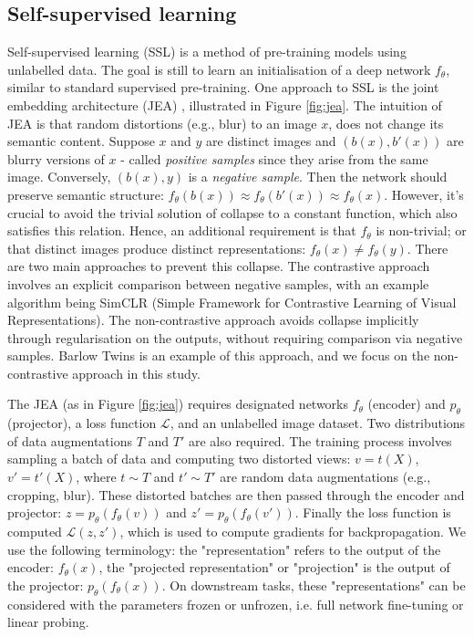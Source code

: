 \documentclass[a4paper,fleqn]{cas-dc}
\begin{document}
\subsection{Self-supervised learning}
Self-supervised learning (SSL) is a method of pre-training models using unlabelled data. The goal is still to learn an initialisation of a deep network $f_{\theta}$, similar to standard supervised pre-training. One approach to SSL is the joint embedding architecture (JEA) \cite{lecun2021self}, illustrated in Figure \ref{fig:jea}. The intuition of JEA  is that random distortions (e.g., blur) to an image $x$, does not change its semantic content. Suppose $x$ and $y$ are distinct images and $(b(x),b'(x))$ are blurry versions of $x$ - called \textit{positive samples} since they arise from the same image. Conversely, $(b(x),y)$ is a \textit{negative sample}. Then  the network should preserve semantic structure: $f_\theta(b(x)) \approx f_\theta(b'(x)) \approx f_\theta(x) $. However, it's crucial to avoid the trivial solution of collapse to a constant function, which also satisfies this relation. Hence, an additional requirement is that $f_\theta$ is non-trivial; or that distinct images produce distinct representations: $f_\theta(x) \neq f_\theta(y)$. There are two main approaches to prevent this collapse. The contrastive approach involves an explicit comparison between negative samples, with an example algorithm being SimCLR \cite{chen2020simple} (Simple Framework for Contrastive Learning of Visual Representations). The non-contrastive 
approach avoids collapse implicitly through regularisation on the outputs, without requiring comparison via negative samples. Barlow Twins \cite{zbontar2021barlow} is an example of this approach, and we focus on the non-contrastive approach in this study.

The JEA (as in Figure \ref{fig:jea}) requires designated networks $f_{\theta}$ (encoder) and $p_{\theta}$ (projector), a loss function $\mathcal{L}$, and an unlabelled image dataset. Two distributions of data augmentations $T$ and $T'$ are also required. The training process involves sampling a batch of data and computing two distorted views: $v=t(X)$, $v'=t'(X)$, where $t \sim T$ and $t' \sim T'$ are random data augmentations (e.g., cropping, blur). These distorted batches are then passed through the encoder and projector: $z=p_\theta(f_\theta(v))$ and $z'=p_\theta(f_\theta(v'))$. Finally the loss function is computed $\mathcal{L}(z,z')$, which is used to compute gradients for backpropagation. We use the following terminology: the "representation" refers to the output of the encoder: $f_\theta(x)$, the "projected representation" or "projection" is the output of the projector: $p_\theta(f_\theta(x))$. On downstream tasks, these "representations" can be considered with the parameters frozen or unfrozen, i.e. full network fine-tuning or linear probing.
\end{document}
